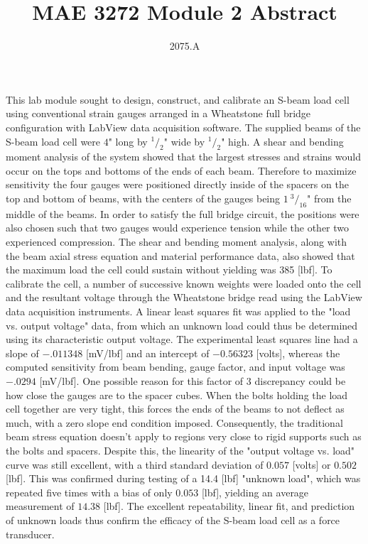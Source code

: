 \documentclass[10pt]{article}
\begin{document}
 

 
\title{MAE 3272 Module 2 Abstract}
\author{2075.A}
\date{}
\maketitle


This lab module sought to design, construct, and calibrate an S-beam load cell using conventional strain gauges arranged in a Wheatstone full bridge configuration with LabView data acquisition software.  The supplied beams of the S-beam load cell were $4$" long by $^1/_2$" wide by $^1/_2$" high.  A shear and bending moment analysis of the system showed that the largest stresses and strains would occur on the tops and bottoms of the ends of each beam.  Therefore to maximize sensitivity the four gauges were positioned directly inside of the spacers on the top and bottom of beams, with the centers of the gauges being $1 \: ^3/_{16}$" from the middle of the beams.  In order to satisfy the full bridge circuit, the positions were also chosen such that two gauges would experience tension while the other two experienced compression.  The shear and bending moment analysis, along with the beam axial stress equation and material performance data, also showed that the maximum load the cell could sustain without yielding was 385 [lbf].  To calibrate the cell, a number of successive known weights were loaded onto the cell and the resultant voltage through the Wheatstone bridge read using the LabView data acquisition instruments.  A linear least squares fit was applied to the "load vs. output voltage" data, from which an unknown load could thus be determined using its characteristic output voltage.  The experimental least squares line had a slope of $-.011348 $ [mV/lbf] and an intercept of $-0.56323$ [volts], whereas the computed sensitivity from beam bending, gauge factor, and input voltage was $ -.0294 $ [mV/lbf].  One possible reason for this factor of 3 discrepancy could be how close the gauges are to the spacer cubes.  When the bolts holding the load cell together are very tight, this forces the ends of the beams to not deflect as much, with a zero slope end condition imposed.  Consequently, the traditional beam stress equation doesn't apply to regions very close to rigid supports such as the bolts and spacers.  Despite this, the linearity of the "output voltage vs. load" curve was still excellent, with a third standard deviation of $0.057$ [volts] or $0.502$ [lbf].  This was confirmed during testing of a 14.4 [lbf] "unknown load", which was repeated five times with a bias of only $0.053$ [lbf], yielding an average measurement of $14.38$ [lbf].  The excellent repeatability, linear fit, and prediction of unknown loads thus confirm the efficacy of the S-beam load cell as a force transducer.
\end{document}
